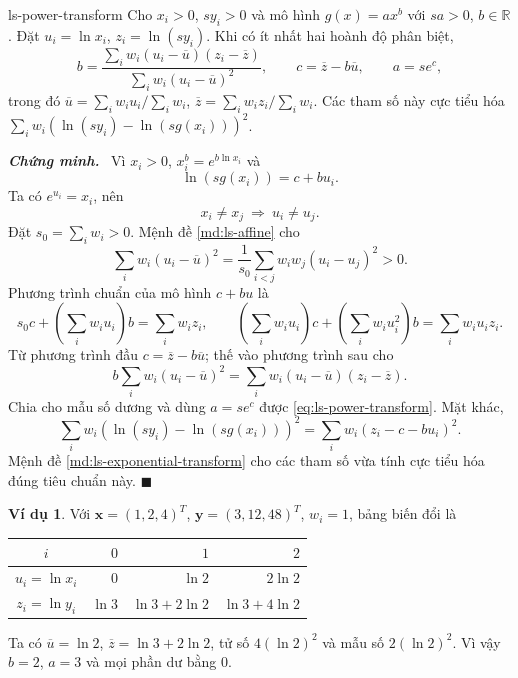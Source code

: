 \documentclass[12pt,a4paper,oneside]{book}
\numberwithin{algorithm}{chapter}
\theoremstyle{definition}
\newtheorem{vidu}{Ví dụ}[chapter]
\newenvironment{chungminh}{\par\medskip\noindent\textbf{\textit{\color{mainblue}Chứng minh.}}\ }{\hfill$\blacksquare$\par\medskip}
\newcommand{\R}{\mathbb{R}}
\begin{document}
\begin{hequa}{}{ls-power-transform}
Cho $x_i>0$, $sy_i>0$ và mô hình $g(x)=ax^b$ với $sa>0$, $b\in\R$. Đặt $u_i=\ln x_i$, $z_i=\ln(sy_i)$. Khi có ít nhất hai hoành độ phân biệt,
\begin{equation}\label{eq:ls-power-transform}
 b=\frac{\sum_iw_i(u_i-\overline u)(z_i-\overline z)}
         {\sum_iw_i(u_i-\overline u)^2},
 \qquad c=\overline z-b\overline u,\qquad a=s e^c,
\end{equation}
trong đó $\overline u=\sum_iw_iu_i/\sum_iw_i$, $\overline z=\sum_iw_iz_i/\sum_iw_i$. Các tham số này cực tiểu hóa $\sum_iw_i(\ln(sy_i)-\ln(sg(x_i)))^2$.
\end{hequa}
\begin{chungminh}
Vì $x_i>0$, $x_i^b=e^{b\ln x_i}$ và
\[
 \ln(sg(x_i))=c+bu_i.
\]
Ta có $e^{u_i}=x_i$, nên
\[
 x_i\ne x_j\ \Longrightarrow\ u_i\ne u_j.
\]
Đặt $s_0=\sum_iw_i>0$. Mệnh đề \ref{md:ls-affine} cho
\[
 \sum_iw_i(u_i-\overline u)^2
 =\frac1{s_0}\sum_{i<j}w_iw_j(u_i-u_j)^2>0.
\]
Phương trình chuẩn của mô hình $c+bu$ là
\[
 s_0c+\left(\sum_iw_iu_i\right)b=\sum_iw_iz_i,
 \qquad
 \left(\sum_iw_iu_i\right)c+\left(\sum_iw_iu_i^2\right)b
 =\sum_iw_iu_iz_i.
\]
Từ phương trình đầu $c=\overline z-b\overline u$; thế vào phương trình sau cho
\[
 b\sum_iw_i(u_i-\overline u)^2
 =\sum_iw_i(u_i-\overline u)(z_i-\overline z).
\]
Chia cho mẫu số dương và dùng $a=s e^c$ được \eqref{eq:ls-power-transform}. Mặt khác,
\[
 \sum_iw_i(\ln(sy_i)-\ln(sg(x_i)))^2
 =\sum_iw_i(z_i-c-bu_i)^2.
\]
Mệnh đề \ref{md:ls-exponential-transform} cho các tham số vừa tính cực tiểu hóa đúng tiêu chuẩn này.
\end{chungminh}
\begin{vidu}
Với $\boldsymbol x=(1,2,4)^T$, $\boldsymbol y=(3,12,48)^T$, $w_i=1$, bảng biến đổi là
\begin{center}
\begin{tabular}{c|rrr}\toprule
$i$&$0$&$1$&$2$\\\midrule
$u_i=\ln x_i$&$0$&$\ln2$&$2\ln2$\\
$z_i=\ln y_i$&$\ln3$&$\ln3+2\ln2$&$\ln3+4\ln2$\\\bottomrule
\end{tabular}
\end{center}
Ta có $\overline u=\ln2$, $\overline z=\ln3+2\ln2$, tử số $4(\ln2)^2$ và mẫu số $2(\ln2)^2$. Vì vậy $b=2$, $a=3$ và mọi phần dư bằng $0$.
\end{vidu}
\end{document}
